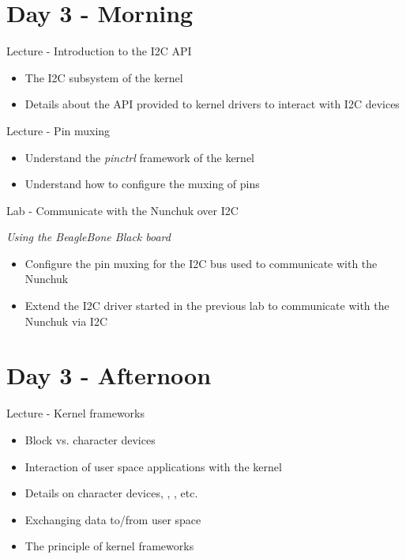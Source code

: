 \documentclass[a4paper,12pt,obeyspaces,spaces,hyphens]{article}
\begin{document}
\section{Day 3 - Morning}

\feagendatwocolumn
{Lecture - Introduction to the I2C API}
{
  \begin{itemize}
  \item The I2C subsystem of the kernel
  \item Details about the API provided to kernel drivers to interact
    with I2C devices
  \end{itemize}
}
{Lecture - Pin muxing}
{
  \begin{itemize}
  \item Understand the {\em pinctrl} framework of the kernel
  \item Understand how to configure the muxing of pins
  \end{itemize}
}

\feagendaonecolumn
{Lab - Communicate with the Nunchuk over I2C}
{
  {\em Using the BeagleBone Black board}
  \begin{itemize}
  \item Configure the pin muxing for the I2C bus used to communicate
    with the Nunchuk
  \item Extend the I2C driver started in the previous lab to
    communicate with the Nunchuk via I2C
  \end{itemize}
}

\section{Day 3 - Afternoon}

\feagendaonecolumn
{Lecture - Kernel frameworks}
{
  \begin{itemize}
  \item Block vs. character devices
  \item Interaction of user space applications with the kernel
  \item Details on character devices, , , etc.
  \item Exchanging data to/from user space
  \item The principle of kernel frameworks
  \end{itemize}
}
\end{document}
